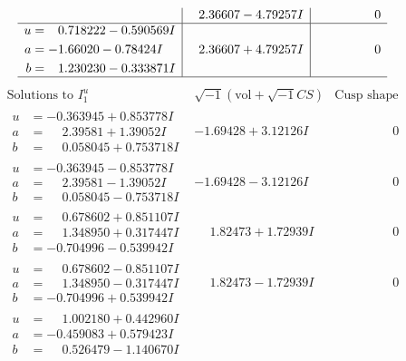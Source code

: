 \documentclass[1p]{elsarticle_modified}
\theoremstyle{definition}
\newcommand{\I}{\sqrt{-1}}
\begin{document}
$$\begin{array}{c|c|c}
 & \phantom{-}2.36607 - 4.79257 I & \phantom{-0.000000 } 0 \\ \hline\begin{aligned}
u &= \phantom{-}0.718222 - 0.590569 I \\
a &= -1.66020 - 0.78424 I \\
b &= \phantom{-}1.230230 - 0.333871 I\end{aligned}
 & \phantom{-}2.36607 + 4.79257 I & \phantom{-0.000000 } 0\\
 \hline 
 \end{array}$$\newpage$$\begin{array}{c|c|c}  
\text{Solutions to }I^u_{1}& \I (\text{vol} + \sqrt{-1}CS) & \text{Cusp shape}\\
 \hline 
\begin{aligned}
u &= -0.363945 + 0.853778 I \\
a &= \phantom{-}2.39581 + 1.39052 I \\
b &= \phantom{-}0.058045 + 0.753718 I\end{aligned}
 & -1.69428 + 3.12126 I & \phantom{-0.000000 } 0 \\ \hline\begin{aligned}
u &= -0.363945 - 0.853778 I \\
a &= \phantom{-}2.39581 - 1.39052 I \\
b &= \phantom{-}0.058045 - 0.753718 I\end{aligned}
 & -1.69428 - 3.12126 I & \phantom{-0.000000 } 0 \\ \hline\begin{aligned}
u &= \phantom{-}0.678602 + 0.851107 I \\
a &= \phantom{-}1.348950 + 0.317447 I \\
b &= -0.704996 - 0.539942 I\end{aligned}
 & \phantom{-}1.82473 + 1.72939 I & \phantom{-0.000000 } 0 \\ \hline\begin{aligned}
u &= \phantom{-}0.678602 - 0.851107 I \\
a &= \phantom{-}1.348950 - 0.317447 I \\
b &= -0.704996 + 0.539942 I\end{aligned}
 & \phantom{-}1.82473 - 1.72939 I & \phantom{-0.000000 } 0 \\ \hline\begin{aligned}
u &= \phantom{-}1.002180 + 0.442960 I \\
a &= -0.459083 + 0.579423 I \\
b &= \phantom{-}0.526479 - 1.140670 I\end{aligned}

\end{array}$$
\end{document}
